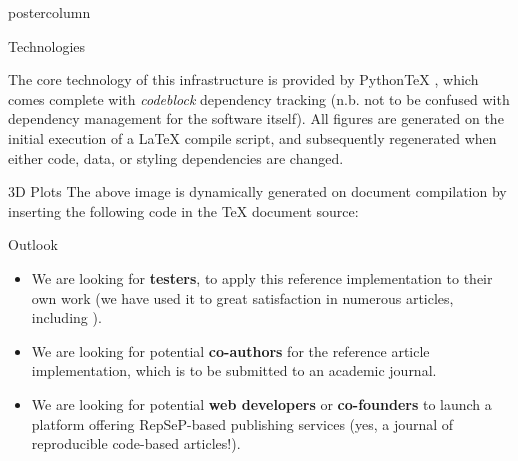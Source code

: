 \documentclass[xcolor=table]{beamer}
\begin{document}
\begin{frame}
\begin{columns}
\begin{column}{.43\textwidth}
\begin{beamercolorbox}[center]{postercolumn}
\begin{minipage}{.98\textwidth}
{\begin{myblock}{Technologies}
\begin{minipage}{.68\textwidth}
							The core technology of this infrastructure is provided by Python\TeX{} \cite{pytex}, which comes complete with \textit{codeblock} dependency tracking (n.b. not to be confused with dependency management for the software itself).
							All figures are generated on the initial execution of a \LaTeX{} compile script, and subsequently regenerated when either code, data, or styling dependencies are changed.
						\end{minipage}
					\end{myblock}\vfill
					\vspace{-0.3em}
					\begin{myblock}{3D Plots}
						\vspace{0.6em}
						\vspace{1.5em}
						The above image is dynamically generated on document compilation by inserting the following code in the \TeX{} document source:
						\vspace{.5em}
                       		                \begin{figure}
                                                \end{figure}
					\end{myblock}\vfill
					\vspace{-0.3em}
					\begin{myblock}{Outlook}
						\begin{itemize}
						        \item We are looking for \textbf{testers}, to apply this reference implementation to their own work (we have used it to great satisfaction in numerous articles, including \cite{irsabi}).
							\item We are looking for potential \textbf{co-authors} for the reference article implementation, which is to be submitted to an academic journal.
							\item We are looking for potential \textbf{web developers} or \textbf{co-founders} to launch a platform offering RepSeP-based publishing services (yes, a journal of reproducible code-based articles!).
						\end{itemize}
					\end{myblock}\vfill
		}\end{minipage}\end{beamercolorbox}

\end{column}
\end{columns}
\end{frame}
\end{document}
